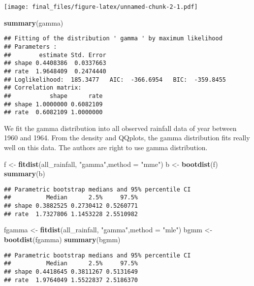 \documentclass[]{article}
\newenvironment{Shaded}{\begin{snugshade}}{\end{snugshade}}
\newcommand{\KeywordTok}[1]{\textcolor[rgb]{0.13,0.29,0.53}{\textbf{#1}}}
\newcommand{\DataTypeTok}[1]{\textcolor[rgb]{0.13,0.29,0.53}{#1}}
\newcommand{\StringTok}[1]{\textcolor[rgb]{0.31,0.60,0.02}{#1}}
\newcommand{\NormalTok}[1]{#1}
\begin{document}
\texttt{[image: final\_files/figure-latex/unnamed-chunk-2-1.pdf]}

\begin{Shaded}
\begin{Highlighting}[]
\KeywordTok{summary}\NormalTok{(gamma)}
\end{Highlighting}
\end{Shaded}

\begin{verbatim}
## Fitting of the distribution ' gamma ' by maximum likelihood 
## Parameters : 
##        estimate Std. Error
## shape 0.4408386  0.0337663
## rate  1.9648409  0.2474440
## Loglikelihood:  185.3477   AIC:  -366.6954   BIC:  -359.8455 
## Correlation matrix:
##           shape      rate
## shape 1.0000000 0.6082109
## rate  0.6082109 1.0000000
\end{verbatim}

We fit the gamma distribution into all observed rainfall data of year
between 1960 and 1964. From the density and QQplots, the gamma
distribution fits really well on this data. The authors are right to use
gamma distribution.

\begin{Shaded}
\begin{Highlighting}[]
\NormalTok{f <-}\StringTok{ }\KeywordTok{fitdist}\NormalTok{(all_rainfall, }\StringTok{"gamma"}\NormalTok{,}\DataTypeTok{method =} \StringTok{"mme"}\NormalTok{)}
\NormalTok{b <-}\StringTok{ }\KeywordTok{bootdist}\NormalTok{(f)}
\KeywordTok{summary}\NormalTok{(b)}
\end{Highlighting}
\end{Shaded}

\begin{verbatim}
## Parametric bootstrap medians and 95% percentile CI 
##          Median      2.5%     97.5%
## shape 0.3882525 0.2730412 0.5260771
## rate  1.7327806 1.1453228 2.5510982
\end{verbatim}

\begin{Shaded}
\begin{Highlighting}[]
\NormalTok{fgamma <-}\StringTok{ }\KeywordTok{fitdist}\NormalTok{(all_rainfall, }\StringTok{"gamma"}\NormalTok{,}\DataTypeTok{method =} \StringTok{"mle"}\NormalTok{)}
\NormalTok{bgmm <-}\StringTok{ }\KeywordTok{bootdist}\NormalTok{(fgamma)}
\KeywordTok{summary}\NormalTok{(bgmm)}
\end{Highlighting}
\end{Shaded}

\begin{verbatim}
## Parametric bootstrap medians and 95% percentile CI 
##          Median      2.5%     97.5%
## shape 0.4418645 0.3811267 0.5131649
## rate  1.9764049 1.5522837 2.5186370
\end{verbatim}
\end{document}
